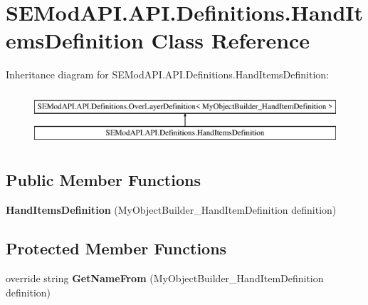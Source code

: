 \hypertarget{class_s_e_mod_a_p_i_1_1_a_p_i_1_1_definitions_1_1_hand_items_definition}{}\section{S\+E\+Mod\+A\+P\+I.\+A\+P\+I.\+Definitions.\+Hand\+Items\+Definition Class Reference}
\label{class_s_e_mod_a_p_i_1_1_a_p_i_1_1_definitions_1_1_hand_items_definition}
Inheritance diagram for S\+E\+Mod\+A\+P\+I.\+A\+P\+I.\+Definitions.\+Hand\+Items\+Definition\+:\begin{figure}[H]
\begin{center}
\leavevmode
\includegraphics[height=2.000000cm]{class_s_e_mod_a_p_i_1_1_a_p_i_1_1_definitions_1_1_hand_items_definition}
\end{center}
\end{figure}
\subsection*{Public Member Functions}
\begin{DoxyCompactItemize}
\item 
\hypertarget{class_s_e_mod_a_p_i_1_1_a_p_i_1_1_definitions_1_1_hand_items_definition_a19e1d2d92a7f95f89980aeecf57e7584}{}{\bfseries Hand\+Items\+Definition} (My\+Object\+Builder\+\_\+\+Hand\+Item\+Definition definition)\label{class_s_e_mod_a_p_i_1_1_a_p_i_1_1_definitions_1_1_hand_items_definition_a19e1d2d92a7f95f89980aeecf57e7584}

\end{DoxyCompactItemize}
\subsection*{Protected Member Functions}
\begin{DoxyCompactItemize}
\item 
\hypertarget{class_s_e_mod_a_p_i_1_1_a_p_i_1_1_definitions_1_1_hand_items_definition_ae2e1f0d2f3f5904217c6ce9fa0de514f}{}override string {\bfseries Get\+Name\+From} (My\+Object\+Builder\+\_\+\+Hand\+Item\+Definition definition)\label{class_s_e_mod_a_p_i_1_1_a_p_i_1_1_definitions_1_1_hand_items_definition_ae2e1f0d2f3f5904217c6ce9fa0de514f}

\end{DoxyCompactItemize}
